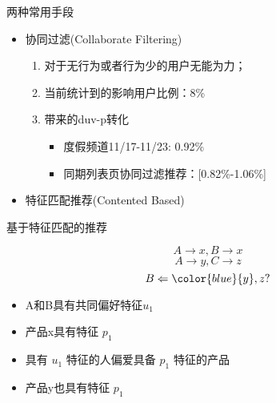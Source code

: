\documentclass{beamer}
\begin{document}
\begin{CJK}{UTF8}{gbsn}
\begin{frame}{两种常用手段}
  \begin{itemize}
  \item {
    协同过滤(Collaborate Filtering)
    \begin{enumerate}
    \item {对于无行为或者行为少的用户无能为力；}
    \item {当前统计到的影响用户比例：8\%}
    \item {
      带来的duv-p转化
      \begin{itemize}
      \item {度假频道11/17-11/23: 0.92\%}
      \item {同期列表页协同过滤推荐：[0.82\%-1.06\%]}
      \end{itemize}
    }
    \end{enumerate}
  }
  \item {
    特征匹配推荐(Contented Based)
  }
  \end{itemize}
\end{frame}

\begin{frame}{基于特征匹配的推荐}

  $$ A \rightarrow x, B \rightarrow x $$
  $$ A \rightarrow y, C \rightarrow z $$
  $$ B \Leftarrow {\color{blue}{y}},z ? $$

  \begin{itemize}
  \item { A和B具有共同偏好特征$ u_1 $ }
  \item { 产品x具有特征 $ p_1 $ }
  \item { 具有 $ u_1 $ 特征的人偏爱具备 $ p_1 $ 特征的产品 }
  \item { 产品y也具有特征 $ p_1 $ }
  \end{itemize}

\end{frame}


\end{CJK}
\end{document}
